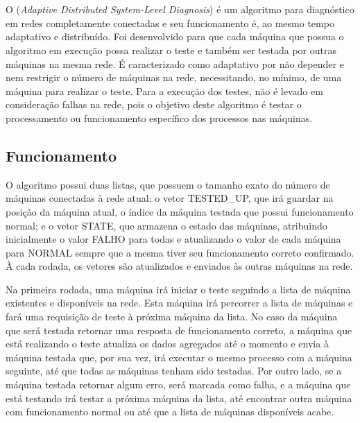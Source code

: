 \section{\adaptive{}}
\label{sec:adaptiveDSD}

O \adaptive (\textit{Adaptive Distributed System-Level Diagnosis}) é um algoritmo para diagnóstico em redes completamente conectadas e seu funcionamento é, ao mesmo tempo 
adaptativo e distribuído. Foi desenvolvido para que cada máquina que possua o algoritmo em execução possa realizar o teste e também ser testada por outras máquinas na mesma rede.
É caracterizado como adaptativo por não depender e nem restrigir o número de máquinas na rede, necessitando, no mínimo, de uma máquina para realizar o teste. Para a execução dos testes, não é levado
em consideração falhas na rede, pois o objetivo deste algoritmo é testar o processamento ou funcionamento específico dos processos nas máquinas.

\subsection{Funcionamento}
\label{sub:adaptiveDSD_Funcionamento}
O algoritmo possui duas listas, que possuem o tamanho exato do número de máquinas conectadas à rede atual: o vetor TESTED\_UP, que irá guardar na posição da máquina atual, 
o índice da máquina testada que possui funcionamento normal; e o vetor STATE, que armazena o estado das máquinas, atribuindo inicialmente o valor FALHO para todas e atualizando o valor de cada máquina para NORMAL sempre que a mesma tiver seu 
funcionamento correto confirmado. À cada rodada, os vetores são atualizados e enviados às outras máquinas na rede.

Na primeira rodada, uma máquina irá iniciar o teste seguindo a lista de máquina existentes e disponíveis na rede. Esta máquina irá percorrer a
lista de máquinas e fará uma requisição de teste à próxima máquina da lista. No caso da máquina que será testada retornar uma resposta de funcionamento correto, a máquina que está realizando o 
teste atualiza os dados agregados até o momento e envia à máquina testada que, por sua vez, irá executar o mesmo processo com a máquina seguinte, até que todas as máquinas tenham sido testadas. Por outro lado, se 
a máquina testada retornar algum erro, será marcada como falha, e a máquina que está testando irá testar a próxima máquina da lista, até encontrar outra máquina com funcionamento normal 
ou até que a lista de máquinas disponíveis acabe.

